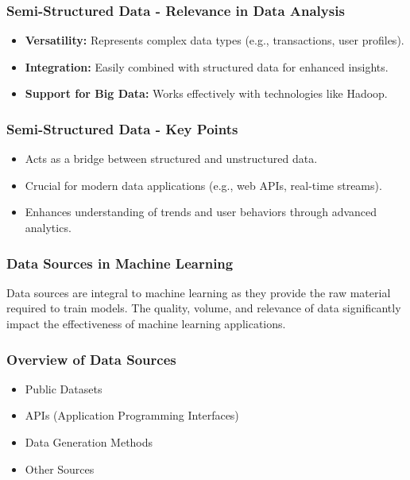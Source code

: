 \documentclass[aspectratio=169]{beamer}
\begin{document}
\begin{frame}[fragile]
    \frametitle{Semi-Structured Data - Relevance in Data Analysis}
    \begin{itemize}
        \item \textbf{Versatility:} Represents complex data types (e.g., transactions, user profiles).
        \item \textbf{Integration:} Easily combined with structured data for enhanced insights.
        \item \textbf{Support for Big Data:} Works effectively with technologies like Hadoop.
    \end{itemize}
\end{frame}

\begin{frame}[fragile]
    \frametitle{Semi-Structured Data - Key Points}
    \begin{itemize}
        \item Acts as a bridge between structured and unstructured data.
        \item Crucial for modern data applications (e.g., web APIs, real-time streams).
        \item Enhances understanding of trends and user behaviors through advanced analytics.
    \end{itemize}
\end{frame}

\begin{frame}[fragile]
    \frametitle{Data Sources in Machine Learning}
    Data sources are integral to machine learning as they provide the raw material required to train models.
    The quality, volume, and relevance of data significantly impact the effectiveness of machine learning applications.
\end{frame}

\begin{frame}[fragile]
    \frametitle{Overview of Data Sources}
    \begin{itemize}
        \item Public Datasets
        \item APIs (Application Programming Interfaces)
        \item Data Generation Methods
        \item Other Sources
    \end{itemize}
\end{frame}
\end{document}

